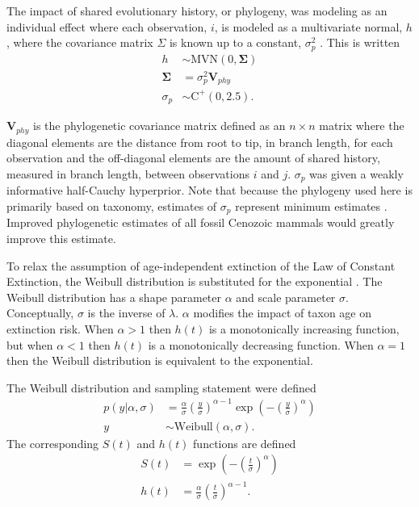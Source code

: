\documentclass{pnastwo}
\begin{document}
\begin{article}
\begin{materials}
The impact of shared evolutionary history, or phylogeny, was modeling as an individual effect where each observation, \(i\), is modeled as a multivariate normal, \(h\), where the covariance matrix \(\Sigma\) is known up to a constant, \(\sigma_{p}^{2}\) \cite{Lynch1991,Housworth2004}. This is written
\begin{align*}
  h &\sim \mathrm{MVN}(0, \mathbf{\Sigma}) \\
  \mathbf{\Sigma} &= \sigma_{p}^{2} \mathbf{V}_{phy} \\
  \sigma_{p} &\sim \mathrm{C}^{+}(0, 2.5).
\end{align*}

\(\mathbf{V}_{phy}\) is the phylogenetic covariance matrix defined as an \(n \times n\) matrix where the diagonal elements are the distance from root to tip, in branch length, for each observation and the off-diagonal elements are the amount of shared history, measured in branch length, between observations \(i\) and \(j\). \(\sigma_{p}\) was given a weakly informative half-Cauchy hyperprior. Note that because the phylogeny used here is primarily based on taxonomy, estimates of \(\sigma_{p}\) represent minimum estimates \cite{Lynch1991,Housworth2004}. Improved phylogenetic estimates of all fossil Cenozoic mammals would greatly improve this estimate.

To relax the assumption of age-independent extinction of the Law of Constant Extinction, the Weibull distribution is substituted for the exponential \cite{Klein2003}. The Weibull distribution has a shape parameter \(\alpha\) and scale parameter \(\sigma\). Conceptually, \(\sigma\) is the inverse of \(\lambda\). \(\alpha\) modifies the impact of taxon age on extinction risk. When \(\alpha > 1\) then \(h(t)\) is a monotonically increasing function, but when \(\alpha < 1\) then \(h(t)\) is a monotonically decreasing function. When \(\alpha = 1\) then the Weibull distribution is equivalent to the exponential.

The Weibull distribution and sampling statement were defined
\begin{align}
  p(y | \alpha, \sigma) &= \frac{\alpha}{\sigma} \left(\frac{y}{\sigma}\right)^{\alpha - 1} \exp\left(-\left(\frac{y}{\sigma}\right)^{\alpha}\right) \nonumber \\
  y &\sim \mathrm{Weibull}(\alpha, \sigma).
  \label{eq:weibull}
\end{align}
The corresponding \(S(t)\) and \(h(t)\) functions are defined
\begin{align}
  S(t) &= \exp\left(-\left(\frac{t}{\sigma}\right)^{\alpha}\right) \label{eq:wei_surv} \\
  h(t) &= \frac{\alpha}{\sigma}\left(\frac{t}{\sigma}\right)^{\alpha - 1} \label{eq:wei_haz}.
\end{align}


\end{materials}
\end{article}
\end{document}
